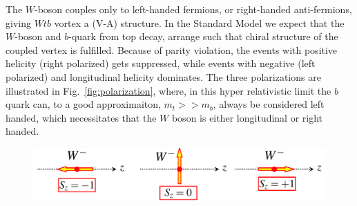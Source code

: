 \documentclass[12pt,a4paper]{article}
\numberwithin{equation}{section}
\begin{document}
The $W$-boson couples only to left-handed fermions, or right-handed
anti-fermions, giving $Wtb$ vortex a (V-A) structure. In the Standard Model we
expect that the $W$-boson and $b$-quark from top decay, arrange such that chiral
structure of the coupled vertex is fulfilled. Because of parity violation, the
events with positive helicity (right polarized) gets suppressed, while events
with negative (left polarized) and longitudinal helicity dominates. The three
polarizations are illustrated in Fig.~\ref{fig:polarization}, where, in this
hyper relativistic limit the $b$ quark can, to a good approximaiton,
$m_t >> m_b$, always be considered left handed, which necessitates that the $W$
boson is either longitudinal or right handed.

\begin{figure}[H]
	 \includegraphics[width=\linewidth]{figures/w_polarization.png}
   \begin{tikzpicture}

\end{tikzpicture}
\end{figure}
\end{document}
